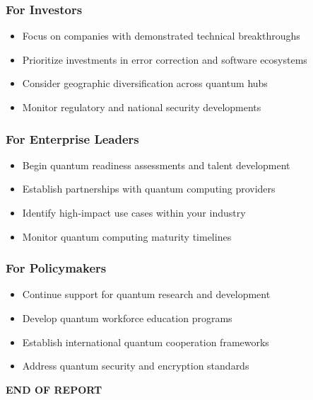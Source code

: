 \documentclass[12pt,a4paper]{article}
\begin{document}
\subsubsection{For Investors}
\begin{itemize}
    \item Focus on companies with demonstrated technical breakthroughs
    \item Prioritize investments in error correction and software ecosystems
    \item Consider geographic diversification across quantum hubs
    \item Monitor regulatory and national security developments
\end{itemize}

\subsubsection{For Enterprise Leaders}
\begin{itemize}
    \item Begin quantum readiness assessments and talent development
    \item Establish partnerships with quantum computing providers
    \item Identify high-impact use cases within your industry
    \item Monitor quantum computing maturity timelines
\end{itemize}

\subsubsection{For Policymakers}
\begin{itemize}
    \item Continue support for quantum research and development
    \item Develop quantum workforce education programs
    \item Establish international quantum cooperation frameworks
    \item Address quantum security and encryption standards
\end{itemize}

\vspace{2cm}

\begin{center}
\Large\textbf{END OF REPORT}
\end{center}

\vspace{1cm}
\end{document}
